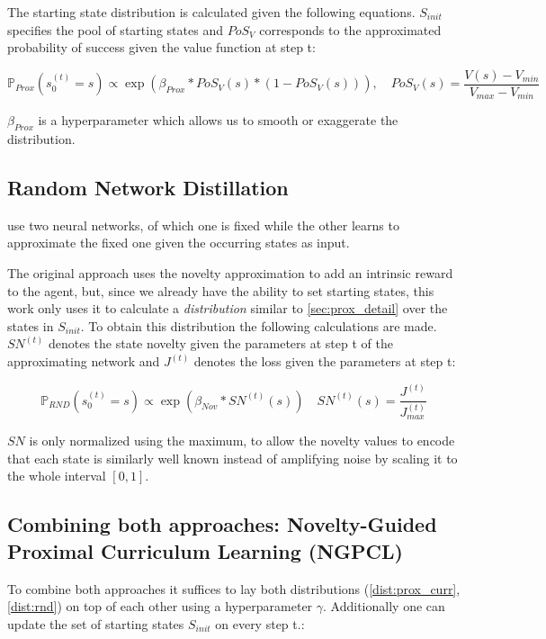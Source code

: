 \documentclass{article}
\begin{document}
The starting state distribution is calculated given the following equations. $S_{init}$ specifies the pool of starting states and $PoS_V$ corresponds to the approximated probability of success given the value function at step t:

\begin{equation}\label{dist:prox_curr}
  \mathbb{P}_{Prox}(s_0^{(t)} = s) \propto \exp(\beta_{Prox} * PoS_V(s) * (1 - PoS_V(s))), \quad PoS_V(s) = \frac{V(s) - V_{min}}{V_{max} - V_{min}}
\end{equation}

$\beta_{Prox}$ is a hyperparameter which allows us to smooth or exaggerate the distribution.

\subsection{Random Network Distillation}
\label{sec:rnd}
\cite{rnd} use two neural networks, of which one is fixed while the other learns to approximate the fixed one given the occurring states as input.

The original approach uses the novelty approximation to add an intrinsic reward to the agent, but, since we already have the ability to set starting states, this work only uses it to calculate a \textit{distribution} similar to \cref{sec:prox_detail} over the states in $S_{init}$.
To obtain this distribution the following calculations are made. $SN^{(t)}$ denotes the state novelty given the parameters at step t of the approximating network and $J^{(t)}$ denotes the loss given the parameters at step t:

\begin{equation}\label{dist:rnd}
  \mathbb{P}_{RND}(s_0^{(t)} = s) \propto \exp(\beta_{Nov} * SN^{(t)}(s)) \quad SN^{(t)}(s) = \frac{J^{(t)}}{J_{max}^{(t)}}
\end{equation}

$SN$ is only normalized using the maximum, to allow the novelty values to encode that each state is similarly well known instead of amplifying noise by scaling it to the whole interval $[0, 1]$.

\subsection{Combining both approaches: Novelty-Guided Proximal Curriculum Learning (NGPCL)}
\label{sec:comb}

To combine both approaches it suffices to lay both distributions (\cref{dist:prox_curr}, \cref{dist:rnd}) on top of each other using a hyperparameter $\gamma$. Additionally one can update the set of starting states $S_{init}$ on every step t.:
\end{document}
